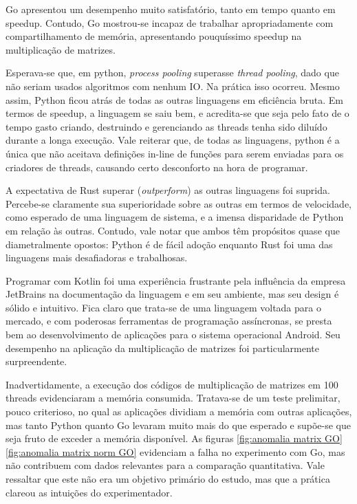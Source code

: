 \documentclass{article}
\begin{document}
Go apresentou um desempenho muito satisfatório, tanto em tempo quanto em speedup. Contudo, Go mostrou-se incapaz de trabalhar apropriadamente com compartilhamento de memória, apresentando pouquíssimo speedup na multiplicação de matrizes.


Esperava-se que, em python, \emph{process pooling} superasse \emph{thread pooling}, dado que não seriam usados algoritmos com nenhum IO. Na prática isso ocorreu. Mesmo assim, Python ficou atrás de todas as outras linguagens em eficiência bruta. Em termos de speedup, a linguagem se saiu bem, e acredita-se que seja pelo fato de o tempo gasto criando, destruindo e gerenciando as threads tenha sido diluído durante a longa execução. Vale reiterar que, de todas as linguagens, python é a única que não aceitava definições in-line de funções para serem enviadas para os criadores de threads, causando certo desconforto na hora de programar.

A expectativa de Rust superar (\emph{outperform}) as outras linguagens foi suprida. Percebe-se claramente sua superioridade sobre as outras em termos de velocidade, como esperado de uma linguagem de sistema, e a imensa disparidade de Python em relação às outras. Contudo, vale notar que ambos têm propósitos quase que diametralmente opostos: Python é de fácil adoção enquanto Rust foi uma das linguagens mais desafiadoras e trabalhosas.

Programar com Kotlin foi uma experiência frustrante pela influência da empresa JetBrains na documentação da linguagem e em seu ambiente, mas seu design é sólido e intuitivo. Fica claro que trata-se de uma linguagem voltada para o mercado, e com poderosas ferramentas de programação assíncronas, se presta bem ao desenvolvimento de aplicações para o sistema operacional Android. Seu desempenho na aplicação da multiplicação de matrizes foi particularmente surpreendente.

Inadvertidamente, a execução dos códigos de multiplicação de matrizes em 100 threads evidenciaram a memória consumida. Tratava-se de um teste prelimitar, pouco criterioso, no qual as aplicações dividiam a memória com outras aplicações, mas tanto Python quanto Go levaram muito mais do que esperado e supõe-se que seja fruto de exceder a memória disponível. As figuras \ref{fig:anomalia matrix GO} \ref{fig:anomalia matrix norm GO} evidenciam a falha no experimento com Go, mas não contribuem com dados relevantes para a comparação quantitativa. Vale ressaltar que este não era um objetivo primário do estudo, mas que a prática clareou as intuições do experimentador.
\end{document}

